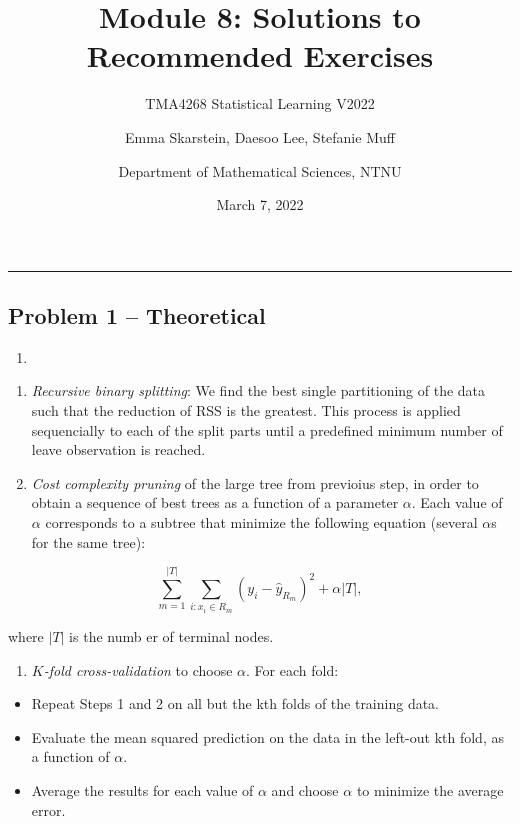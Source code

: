 \documentclass[
]{article}
\title{Module 8: Solutions to Recommended Exercises}
\subtitle{TMA4268 Statistical Learning V2022}
\author{Emma Skarstein, Daesoo Lee, Stefanie Muff \and Department of
Mathematical Sciences, NTNU}
\date{March 7, 2022}
\providecommand{\tightlist}{%
  \setlength{\itemsep}{0pt}\setlength{\parskip}{0pt}}
\begin{document}
\maketitle

\begin{center}\rule{0.5\linewidth}{0.5pt}\end{center}

\hypertarget{problem-1-theoretical}{%
\subsection{Problem 1 -- Theoretical}\label{problem-1-theoretical}}

\begin{enumerate}
\def\labelenumi{\alph{enumi})}
\tightlist
\item
\end{enumerate}

\begin{enumerate}
\def\labelenumi{\arabic{enumi}.}
\item
  \emph{Recursive binary splitting}: We find the best single
  partitioning of the data such that the reduction of RSS is the
  greatest. This process is applied sequencially to each of the split
  parts until a predefined minimum number of leave observation is
  reached.
\item
  \emph{Cost complexity pruning} of the large tree from previoius step,
  in order to obtain a sequence of best trees as a function of a
  parameter \(\alpha\). Each value of \(\alpha\) corresponds to a
  subtree that minimize the following equation (several \(\alpha\)s for
  the same tree):
\end{enumerate}

\[\sum_{m=1}^{|T|}\sum_{i:x_i\in R_m}(y_i - \hat y_{R_m})^2 + \alpha |T|,\]

where \(|T|\) is the numb er of terminal nodes.

\begin{enumerate}
\def\labelenumi{\arabic{enumi}.}
\setcounter{enumi}{2}
\tightlist
\item
  \emph{\(K\)-fold cross-validation} to choose \(\alpha\). For each
  fold:
\end{enumerate}

\begin{itemize}
\tightlist
\item
  Repeat Steps 1 and 2 on all but the kth folds of the training data.
\item
  Evaluate the mean squared prediction on the data in the left-out kth
  fold, as a function of \(\alpha\).
\item
  Average the results for each value of \(\alpha\) and choose \(\alpha\)
  to minimize the average error.
\end{itemize}
\end{document}
